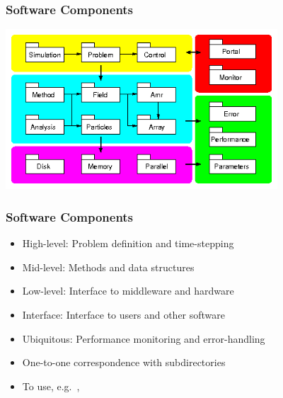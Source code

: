 \begin{frame}[fragile] \frametitle{Software Components}
\centerline{\includegraphics[width=4in]{components.png}}
\end{frame}
\begin{frame}[fragile] \frametitle{Software Components}
\begin{itemize}
\item \color{gray} High-level: Problem definition and time-stepping
\item \color{cyan} Mid-level: Methods and data structures
\item \color{magenta} Low-level: Interface to middleware and hardware
\item \color{red} Interface: Interface to users and other software
\item \color{green} Ubiquitous: Performance monitoring and error-handling
\end{itemize}
\begin{itemize}
\item One-to-one correspondence with subdirectories
\item To use, e.g.~, \textcolor<3>{blue}{}
\end{itemize}
\end{frame}